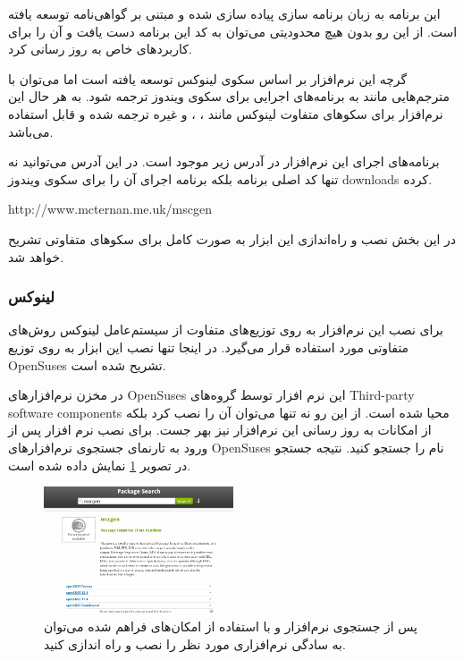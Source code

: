 این برنامه به زبان برنامه سازی  پیاده سازی شده و مبتنی بر گواهی‌نامه
 توسعه یافته است. از این رو بدون هیچ محدودیتی می‌توان به کد این برنامه
دست یافت و آن را برای کاربردهای خاص به روز رسانی کرد.

گرچه این نرم‌افزار بر اساس سکوی لینوکس توسعه یافته است اما می‌توان با مترجم‌هایی
مانند  به برنامه‌های اجرایی برای سکوی ویندوز ترجمه شود. به هر حال این
نرم‌افزار برای سکو‌های متفاوت لینوکس مانند ، ،
 و غیره ترجمه شده و قابل استفاده می‌باشد.

\begin{webreference}
برنامه‌های اجرای این نرم‌افزار در آدرس زیر موجود است. در این آدرس می‌توانید نه
تنها کد اصلی برنامه بلکه برنامه اجرای آن را برای سکوی ویندوز \glspl{download}
کرده.

\begin{latin}
http://www.mcternan.me.uk/mscgen
\end{latin}
\end{webreference}

در این بخش نصب و راه‌اندازی این ابزار به صورت کامل برای سکوهای متفاوتی تشریح
خواهد شد.


\subsubsection{لینوکس}

برای نصب این نرم‌افزار به روی توزیع‌های متفاوت از سیستم‌عامل لینوکس روش‌های
متفاوتی مورد استفاده قرار می‌گیرد. در اینجا تنها نصب این ابزار به روی توزیع
\glspl{OpenSuse} تشریح شده است.

در مخزن نرم‌افزارهای \glspl{OpenSuse} این نرم افزار توسط گروه‌های 
\glspl{Third-party software component} محیا شده است. از این رو نه تنها می‌توان آن را نصب کرد بلکه
از امکانات به روز رسانی این نرم‌افزار نیز بهر جست. برای نصب نرم افزار پس از ورود
به تارنمای جستجوی نرم‌افزارهای \glspl{OpenSuse} نام  را جستجو کنید.
نتیجه جستجو در تصویر \ref{image/write/graph/mscgen/install-OpenSuse-1} نمایش
داده شده است.

\begin{figure}
	\centering
	\includegraphics[width=0.5\textwidth]{image/write/graph/mscgen/install-OpenSuse-1}
	\caption[جستجوی نرم‌افزار  در موتور جستجوی ]{
		پس از جستجوی نرم‌افزار  و با استفاده از امکان‌های فراهم شده می‌توان
		به سادگی نرم‌افزاری مورد نظر را نصب و راه اندازی کنید.
	}
	\label{image/write/graph/mscgen/install-OpenSuse-1}
\end{figure}

